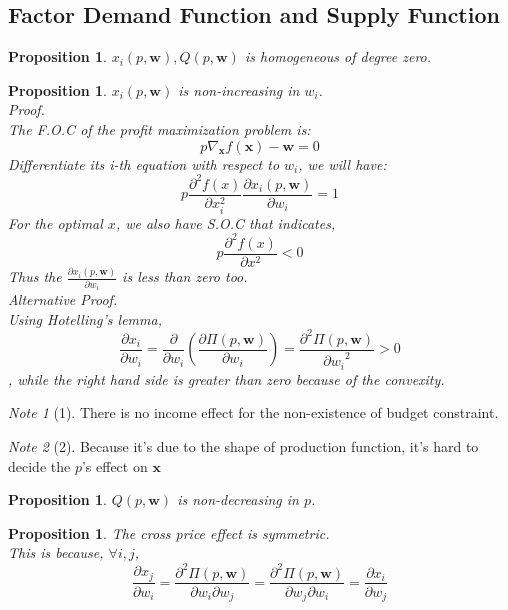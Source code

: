 \documentclass{book}
\theoremstyle{plain}
\newtheorem{prop}[thm]{Proposition}
\theoremstyle{definition}
\theoremstyle{remark}
\newtheorem*{note}{Note}
\begin{document}
\subsection{Factor Demand Function and Supply Function}
\begin{prop}
$x_i(p,\bm{w}), Q(p,\bm{w})$ is homogeneous of degree zero.
\end{prop}
\begin{prop}
$x_i(p,\bm{w})$ is non-increasing in $w_i$.\\
Proof.\\
 The F.O.C of the profit maximization problem is:
\begin{equation}
	p \nabla_{\bm{x}} f(\bm{x}) - \bm{w} = 0
\end{equation}
Differentiate its i-th equation with respect to $w_i$, we will have:
\begin{equation}
	p \frac{ \partial^2 f(x)}{\partial  x_i^2} \frac{\partial x_i(p,\bm{w})}{\partial w_i} = 1
\end{equation}
For the optimal $x$, we also have S.O.C that indicates,
\begin{equation}
	p \frac{\partial^2 f(x)}{\partial x^2}<0
\end{equation}
Thus the $\frac{\partial x_i(p,\bm{w})}{\partial w_i}$ is less than zero too.\\
Alternative Proof.\\
Using Hotelling's lemma, 
\begin{equation}
	\frac{\partial x_i}{\partial w_i} = \frac{\partial}{\partial w_i}(\frac{\partial \Pi(p, \bm{w})}{\partial w_i}) = \frac{\partial^2 \Pi(p, \bm{w})}{{\partial w_i}^2}>0
\end{equation}
, while the right hand side is greater than zero because of the convexity.

\end{prop}
\begin{note}[1]
There is no income effect for the non-existence of budget constraint.
\end{note}
\begin{note}[2]
Because it's due to the shape of production function, it's hard to decide the $p$'s effect on $\bm{x}$
\end{note}
\begin{prop}
$Q(p,\bm{w})$ is non-decreasing in $p$.
\end{prop}

\begin{prop}
The cross price effect is symmetric.\\
This is because, $\forall i,j$,
\begin{equation}
	\frac{\partial x_j}{\partial w_i} = \frac{\partial^2 \Pi(p, \bm{w})} {\partial w_i \partial w_j}=\frac{\partial^2 \Pi(p, \bm{w})} {\partial w_j \partial w_i} = \frac{\partial x_i}{\partial w_j}
\end{equation}
\end{prop}
\end{document}

